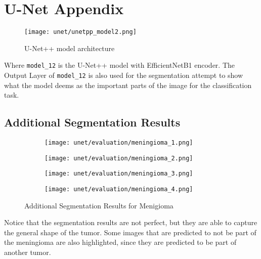 \section{U-Net Appendix}\label{s:unetAppendix}

\begin{figure}[H]
  \begin{center}
    \texttt{[image: unet/unetpp\_model2.png]}
  \end{center}
  \caption{U-Net++ model architecture}\label{fig:unetpp_model}
\end{figure}

Where \texttt{model\_12} is the U-Net++ model with EfficientNetB1 encoder. The Output Layer of \texttt{model\_12} is also used for the segmentation attempt to show what the model deems as the important parts of the image for the classification task.

\subsection{Additional Segmentation Results}

\begin{figure}[H]
  \centering
  \begin{subfigure}[b]{0.23\textwidth}
    \centering
    \texttt{[image: unet/evaluation/meningioma\_1.png]}
  \end{subfigure}
  \hfill
  \begin{subfigure}[b]{0.23\textwidth}
    \centering
    \texttt{[image: unet/evaluation/meningioma\_2.png]}
  \end{subfigure}
  \hfill
  \begin{subfigure}[b]{0.23\textwidth}
    \centering
    \texttt{[image: unet/evaluation/meningioma\_3.png]}
  \end{subfigure}
  \hfill
  \begin{subfigure}[b]{0.23\textwidth}
    \centering
    \texttt{[image: unet/evaluation/meningioma\_4.png]}
  \end{subfigure}
  \caption{Additional Segmentation Results for Menigioma}
  \label{fig:additional_malignoma_segmentation}
\end{figure}

Notice that the segmentation results are not perfect, but they are able to capture the general shape of the tumor. Some images that are predicted to not be part of the meningioma are also highlighted, since they are predicted to be part of another tumor.

%
